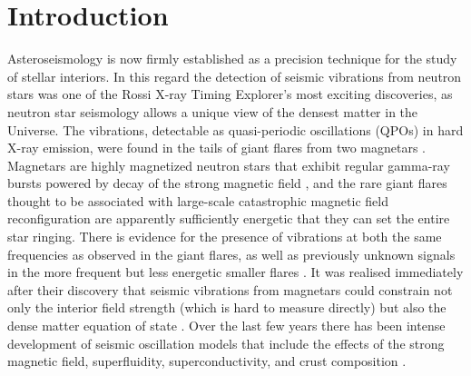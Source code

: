 \documentclass{emulateapj}
\begin{document}
\section{Introduction}
\label{sec:introduction}
Asteroseismology is now firmly established as a precision technique for the study of stellar interiors. In this regard the detection of seismic vibrations from neutron stars was one of the Rossi X-ray Timing Explorer's most exciting discoveries, as neutron star seismology allows a unique view of the densest matter in the Universe. The vibrations, detectable as quasi-periodic oscillations (QPOs) in hard X-ray emission, were found in the tails of giant flares from two magnetars \citep{Israel05, Strohmayer05, Strohmayer06, Watts06}. Magnetars are highly magnetized neutron stars that exhibit regular gamma-ray bursts powered by decay of the strong magnetic field \citep{Thompson95}, and the rare giant flares thought to be associated with large-scale catastrophic magnetic field reconfiguration are apparently sufficiently energetic that they can set the entire star ringing. There is evidence for the presence of vibrations at both the same frequencies as observed in the giant flares, as well as previously unknown signals in the more frequent but less energetic smaller flares \citep{Huppenkothen13, Huppenkothen14}. It was realised immediately after their discovery that seismic vibrations from magnetars could constrain not only the interior field strength (which is hard to measure directly) but also the dense matter equation of state \citep{Samuelsson07,Watts07}. Over the last few years there has been intense development of seismic oscillation models that include the effects of the strong magnetic field, superfluidity, superconductivity, and crust composition \citep{Levin06,Levin07,Glampedakis06,Sotani2008,Andersson09,Steiner09,vanHoven11,vanHoven12, Colaiuda11,Gabler12, Gabler13, Passamonti13a, Passamonti13b}.   
\end{document}

